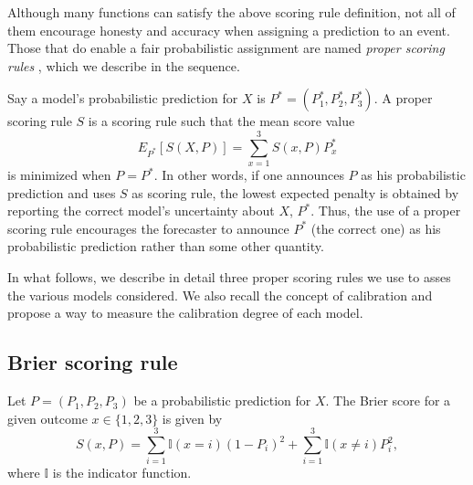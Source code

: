 \documentclass[journal,article,accept,moreauthors,pdftex,12pt,a4paper]{mdpi}
\begin{document}
    Although many functions can satisfy the above scoring rule definition, not all of them encourage honesty and accuracy when assigning a prediction to an event. Those that do enable a fair probabilistic assignment are named \emph{proper scoring rules} \cite{lad}, which we describe in the sequence.


    Say a model's probabilistic prediction for $X$ is $P^*=(P_1^*,P_2^*,P_3^*).$ A proper scoring rule $S$ is a scoring rule  such that the mean score value
    $$E_{P^*}[S(X,P)]=\sum_{x=1}^3 S(x,P)P^*_x$$
     is minimized when $P=P^*$.
    In other words, if one announces
    $P$ as his probabilistic prediction
    and uses $S$ as scoring rule, the lowest
    expected penalty is obtained by reporting the correct model's  uncertainty about $X$, $P^*$.
    Thus, the use of a proper scoring rule encourages the forecaster to announce $P^*$ (the correct one)
    as his probabilistic prediction  rather than some other quantity.

    In what follows, we describe in detail three proper scoring rules we use to asses the various models considered.
    We also recall the concept of calibration and propose a way to measure the calibration degree of each model.




    \subsection{Brier scoring rule}

    Let $P=(P_1,P_2,P_3)$ be a probabilistic prediction  for $X$.
    The Brier score for a given outcome $x\in\{1,2,3\}$ is given by
    $$S(x,P)= \sum_{i=1}^3\mathbb{I}(x=i)(1- P_i)^2+\sum_{i=1}^3\mathbb{I}(x\neq i)P^2_i,$$
    where $\mathbb{I}$ is the indicator function.
\end{document}
